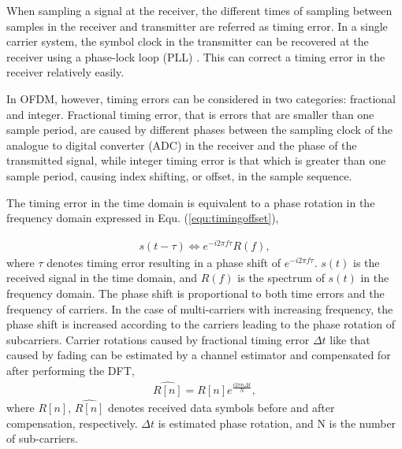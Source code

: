 When sampling a signal at the receiver, the different times of sampling between samples in the receiver and transmitter are referred as timing error.
In a single carrier system, the symbol clock in the transmitter can be recovered at the receiver using a phase-lock loop (PLL) \cite{farhang2008signal}. 
This can correct a timing error in the receiver relatively easily.

In OFDM, however, timing errors can be considered in two categories: fractional and integer. 
Fractional timing error, that is errors that are smaller than one sample period, are caused by different phases between the sampling clock of the analogue to digital converter (ADC) in the receiver and the phase of the transmitted signal, while integer timing error is that which is greater than one sample period, causing index shifting, or offset, in the sample sequence.

The timing error in the time domain is equivalent to a phase rotation in the frequency domain expressed in Equ. (\ref{equ:timingoffset}),

\begin{eqnarray}
\label{equ:timingoffset}
               s (t - \tau )   \Leftrightarrow  e^{-i2\pi f\tau} R(f),
\end{eqnarray}	
where $\tau$ denotes timing error resulting in a phase shift of $e^{-i2\pi f\tau}$. 
$s(t)$ is the received signal in the time domain, and $R(f)$ is the spectrum of $s(t)$ in the frequency domain.
The phase shift is proportional to both time errors and the frequency of carriers.
In the case of multi-carriers with increasing frequency, the phase shift is increased according to the carriers leading to the phase rotation of subcarriers.
Carrier rotations caused by fractional timing error $\Delta t$ like that caused by fading can be estimated by a channel estimator and compensated for after performing the DFT,
\begin{eqnarray}
\label{equ:rotationcompensation}
               \widehat{R[n]} = R[n] e^{\frac{i2\pi n \Delta  t}{N}},
\end{eqnarray}
where $R[n]$, $\widehat{R[n]}$ denotes received data symbols before and after compensation, respectively. $\Delta t$ is estimated phase rotation, and N is the number of sub-carriers.

